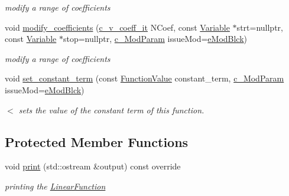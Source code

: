 \begin{Indent}
\begin{DoxyCompactItemize}
\begin{DoxyCompactList}\small\item\em modify a range of coefficients \end{DoxyCompactList}\item 
void \mbox{\hyperlink{class_s_m_spp__di__unipi__it_1_1_linear_function_a307bb1139542905caafd786ee0e823bf}{modify\+\_\+coefficients}} (\mbox{\hyperlink{class_s_m_spp__di__unipi__it_1_1_linear_function_a9e665512d3a7f7aae5031e99c675cc11}{c\+\_\+v\+\_\+coeff\+\_\+it}} N\+Coef, const \mbox{\hyperlink{class_s_m_spp__di__unipi__it_1_1_variable}{Variable}} $\ast$strt=nullptr, const \mbox{\hyperlink{class_s_m_spp__di__unipi__it_1_1_variable}{Variable}} $\ast$stop=nullptr, \mbox{\hyperlink{group___modification___t_y_p_e_s_ga544246d8c462e9a2d817c2c30797968f}{c\+\_\+\+Mod\+Param}} issue\+Mod=\mbox{\hyperlink{group___modification___t_y_p_e_s_gga48fddcdd03a03f49b7e389ca1ed938d4a21b14b26b1c0093a0905f6fc010bad29}{e\+Mod\+Blck}})
\begin{DoxyCompactList}\small\item\em modify a range of coefficients \end{DoxyCompactList}\item 
void \mbox{\hyperlink{class_s_m_spp__di__unipi__it_1_1_linear_function_a7a2c08d9d2ada7a0a6e6a3ab3e25fd2c}{set\+\_\+constant\+\_\+term}} (const \mbox{\hyperlink{class_s_m_spp__di__unipi__it_1_1_function_a9ad432406b609e28d340f73e9474bffe}{Function\+Value}} constant\+\_\+term, \mbox{\hyperlink{group___modification___t_y_p_e_s_ga544246d8c462e9a2d817c2c30797968f}{c\+\_\+\+Mod\+Param}} issue\+Mod=\mbox{\hyperlink{group___modification___t_y_p_e_s_gga48fddcdd03a03f49b7e389ca1ed938d4a21b14b26b1c0093a0905f6fc010bad29}{e\+Mod\+Blck}})
\begin{DoxyCompactList}\small\item\em $<$ sets the value of the constant term of this function. \end{DoxyCompactList}\end{DoxyCompactItemize}
\end{Indent}
\subsection*{Protected Member Functions}
\begin{DoxyCompactItemize}
\item 
\mbox{\label{class_s_m_spp__di__unipi__it_1_1_linear_function_a87f6fa05f41e6d6f00fc4e0b12321abc}} 
void \mbox{\hyperlink{class_s_m_spp__di__unipi__it_1_1_linear_function_a87f6fa05f41e6d6f00fc4e0b12321abc}{print}} (std\+::ostream \&output) const override
\begin{DoxyCompactList}\small\item\em printing the \mbox{\hyperlink{class_s_m_spp__di__unipi__it_1_1_linear_function}{Linear\+Function}} \end{DoxyCompactList}\end{DoxyCompactItemize}
